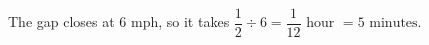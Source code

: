 The gap closes at $6$ mph, so it takes $\dfrac12\div6=\dfrac1{12}$ hour $=\boxed{5\text{ minutes}}$.
